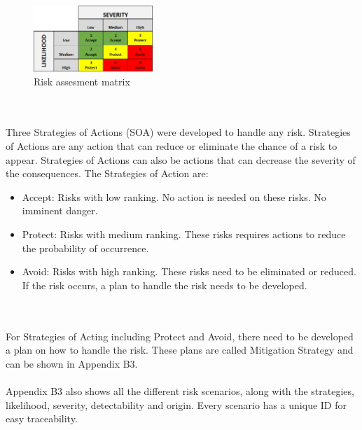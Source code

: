 \begin{figure}[H]
    \centering
    \includegraphics[width = 0.4\textwidth]{VAPIQ-PICTURES/RiskAss.jpg}
    \caption{Risk assesment matrix}
    \label{AssRisk}
\end{figure}
\\\\ \noindent
Three Strategies of Actions (SOA) were developed to handle any risk. Strategies of Actions are any action that can reduce or eliminate the chance of a risk to appear. Strategies of Actions can also be actions that can decrease the severity of the consequences. The Strategies of Action are:
\begin{itemize}
\item{Accept: Risks with low ranking. No action is needed on these risks. No imminent danger.}
\item{Protect: Risks with medium ranking. These risks requires actions to reduce the probability of occurrence.}
\item{Avoid: Risks with high ranking. These risks need to be eliminated or reduced. If the risk occurs, a plan to handle the risk needs to be developed.}
\end{itemize}
\\\\
For Strategies of Acting including Protect and Avoid, there need to be developed a plan on how to handle the risk. These plans are called Mitigation Strategy and can be shown in Appendix B3.
\\\\
Appendix B3 also shows all the different risk scenarios, along with the strategies, likelihood, severity, detectability and origin. Every scenario has a unique ID for easy traceability.

